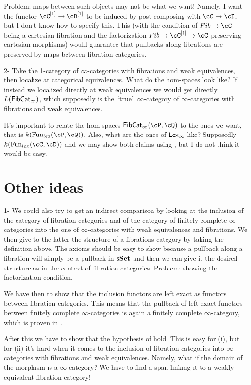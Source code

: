 \documentclass[a4paper,12pt]{scrartcl}
\begin{document}
Problem: maps between such objects may not be what we want! Namely, I want the
functor $\cC^{[1]}\rightarrow\cD^{[1]}$ to be induced by post-composing with
$\cC\rightarrow\cD$, but I don't know how to specify this. This (with the
condition of $Fib\rightarrow\cC$ being a cartesian fibration and the
factorization $Fib\rightarrow\cC^{[1]}\rightarrow\cC$ preserving cartesian
morphisms) would guarantee that pullbacks along fibrations are preserved by maps
between fibration categories.

2- Take the 1-category of $\infty$-categories with fibrations and weak
equivalences, then localize at categorical equivalences. What do the hom-spaces
look like? If instead we localized directly at weak equivalences we would get
directly $L(\operatorname{\mathsf{FibCat}}_\infty)$, which supposedly is the ``true'' $\infty$-category
of $\infty$-categories with fibrations and weak equivalences.

It's important to relate the hom-spaces $\FibCat_\infty(\cP,\cQ)$ to the ones we
want, that is $k(\Fun_{lex}(\cP,\cQ))$. Also, what are the ones of $\operatorname{\mathsf{Lex}_\infty}$ like?
Supposedly $k(\Fun_{lex}(\cC,\cD))$ and we may show both claims using
\cite[Prop.\ 7.10.6]{Cis19}, but I do not think it would be easy.

\section{Other ideas}

1- We could also try to get an indirect comparison by looking at the inclusion of the category of fibration categories and of the category of finitely complete $\infty$-categories into the one of $\infty$-categories with weak equivalences and fibrations. We then give to the latter the structure of a fibrations category by taking the definition above. The axioms should be easy to show because a pullback along a fibration will simply be a pullback in $\operatorname{\mathbf{sSet}}$ and then we can give it the desired structure as in the context of fibration categories. Problem: showing the factorization condition.

We have then to show that the inclusion functors are left exact as functors
between fibration categories. This means that the pullback of left exact
functors between finitely complete $\infty$-categories is again a finitely
complete $\infty$-category, which is proven in \cite[Lem.\ 2.11]{Szu17b}.

After this we have to show that the hypothesis of \cite[Thm.\ 7.6.15]{Cis19} hold. This is easy for (i), but for (ii) it's hard when it comes to the inclusion of fibration categories into $\infty$-categories with fibrations and weak equivalences. Namely, what if the domain of the morphism is a $\infty$-category? We have to find a span linking it to a weakly equivalent fibration category!
\end{document}
